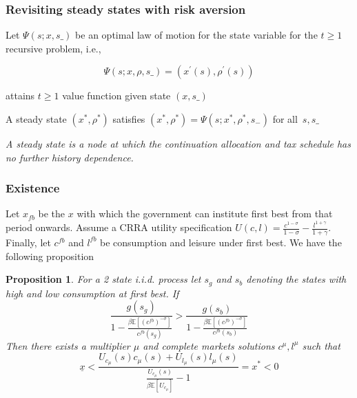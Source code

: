 \documentclass{beamer}
\newcommand{\EE}{\mathbb E}
\newtheorem{proposition}{Proposition}
\begin{document}
 
\begin{frame}
 \frametitle{Revisiting steady states with risk aversion}
Let $\Psi \left( s;{x},s\_\right) $ be an optimal  law of motion for the state variable
for the $t\geq1$ recursive problem, i.e.,


\[\Psi \left( s;{x},%
{\rho },s\_\right) =\left( x^{\prime }\left( s\right) ,\rho ^{\prime
}\left( s\right) \right) \]

attains $t\geq1$ value function given state $\left({x},s\_\right) $

\begin{definition}
 A steady state  $\left( {x}^{*},{\rho} ^{*}\right) $  satisfies $\left({ x}^{*},{\rho}
^{*}\right) =\Psi \left( s;{x}^{*},{\rho} ^{*},s_{-}\right) $ for all $%
\,s,s\_$
\end{definition}
\vspace{3mm}
\emph{A steady state is a node at which the continuation allocation and tax schedule has no further history dependence. }

 \end{frame}




 \begin{frame}
	\frametitle{Existence}
	Let $x_{fb}$ be the $x$ with which the government can institute first best from that period onwards.  Assume a CRRA utility specification $U(c,l) = \frac{c^{1-\sigma}}{1-\sigma} -\frac{ l^{1+\gamma}}{1+\gamma}$.  Finally, let  $c^{fb}$ and $l^{fb}$ be consumption and leisure under first best.  We have the following proposition
	\begin{proposition}  For a 2 state i.i.d. process let  $s_g$ and $s_b$ denoting the states with high and low consumption at first best.  If
	\[
		\frac{g(s_g)}{1-\frac{\beta\EE[(c^{fb})^{-\sigma}]}{c^{fb}(s_g)}} > \frac{g(s_b)}{1-\frac{\beta\EE[(c^{fb})^{-\sigma}]}{c^{fb}(s_b)}}
	\]  Then there exists a multiplier $\mu$ and complete markets solutions $c^\mu,l^\mu$ such that 
	\[
	\underline x<\frac{U_{c_\mu}(s)c_\mu(s) + U_{l_\mu}(s) l_\mu(s)}{\frac{U_{c_\mu}(s)}{\beta\EE[U_{c_\mu}]}-1} = x^* <0
	\]
	\end{proposition} 
\end{frame}


%   
 
 
\end{document}
